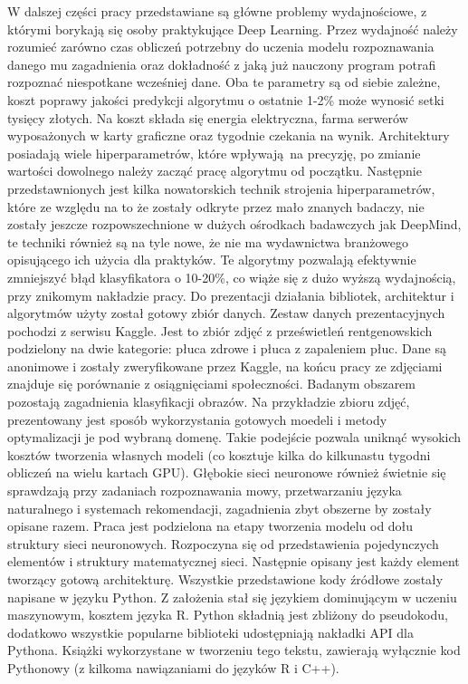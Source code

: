\documentclass[12pt,a4paper,twoside,titlepage,openright]{book}
\begin{document}
W dalszej części pracy przedstawiane są główne problemy wydajnościowe, z którymi borykają się osoby praktykujące Deep Learning. Przez wydajność należy rozumieć zarówno czas obliczeń potrzebny do uczenia modelu rozpoznawania danego mu zagadnienia oraz dokładność z jaką już nauczony program potrafi rozpoznać niespotkane wcześniej dane. Oba te parametry są od siebie zależne, koszt poprawy jakości predykcji algorytmu o ostatnie 1-2\% może wynosić setki tysięcy złotych. Na koszt składa się energia elektryczna, farma serwerów wyposażonych w karty graficzne oraz tygodnie czekania na wynik. Architektury posiadają wiele hiperparametrów, które wpływają na precyzję, po zmianie wartości dowolnego należy zacząć pracę algorytmu od początku. Następnie przedstawnionych jest kilka nowatorskich technik strojenia hiperparametrów, które ze względu na to że zostały odkryte przez mało znanych badaczy, nie zostały jeszcze rozpowszechnione w dużych ośrodkach badawczych jak DeepMind, te techniki również są na tyle nowe, że nie ma wydawnictwa branżowego opisującego ich użycia dla praktyków. Te algorytmy pozwalają efektywnie zmniejszyć błąd klasyfikatora o 10-20\%, co wiąże się z dużo wyższą wydajnością, przy znikomym nakładzie pracy. Do prezentacji działania bibliotek, architektur i algorytmów użyty został gotowy zbiór danych. Zestaw danych prezentacyjnych pochodzi z serwisu Kaggle. Jest to zbiór zdjęć z prześwietleń rentgenowskich podzielony na dwie kategorie: płuca zdrowe i płuca z zapaleniem płuc. Dane są anonimowe i zostały zweryfikowane przez Kaggle, na końcu pracy ze zdjęciami znajduje się porównanie z osiągnięciami społeczności. Badanym obszarem pozostają zagadnienia klasyfikacji obrazów. Na przykładzie zbioru zdjęć, prezentowany jest sposób wykorzystania gotowych moedeli i metody optymalizacji je pod wybraną domenę. Takie podejście pozwala uniknąć wysokich kosztów tworzenia własnych modeli (co kosztuje kilka do kilkunastu tygodni obliczeń na wielu kartach GPU). Głębokie sieci neuronowe również świetnie się sprawdzają przy zadaniach rozpoznawania mowy, przetwarzaniu języka naturalnego i systemach rekomendacji, zagadnienia zbyt obszerne by zostały opisane razem.
Praca jest podzielona na etapy tworzenia modelu od dołu struktury sieci neuronowych. Rozpoczyna się od przedstawienia pojedynczych elementów i struktury matematycznej sieci. Następnie opisany jest każdy element tworzący gotową architekturę.
Wszystkie przedstawione kody źródłowe zostały napisane w języku Python. Z założenia stał się językiem dominującym w uczeniu maszynowym, kosztem języka R. Python składnią jest zbliżony do pseudokodu, dodatkowo wszystkie popularne biblioteki udostępniają nakładki API dla Pythona. Książki wykorzystane w tworzeniu tego tekstu, zawierają wyłącznie kod Pythonowy (z kilkoma nawiązaniami do języków R i C++).
\end{document}
